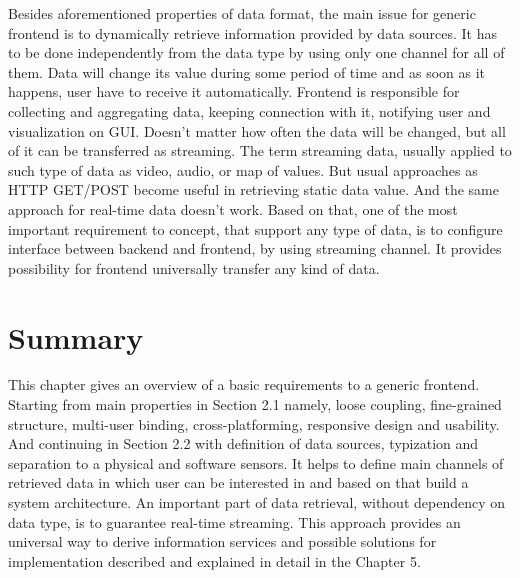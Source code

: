 	Besides aforementioned properties of data format, the main issue for generic frontend is to dynamically retrieve information provided by data sources. It has to be done independently from the data type by using only one channel for all of them. Data will change its value during some period of time and as soon as it happens, user have to receive it automatically. Frontend is responsible for collecting and aggregating data, keeping connection with it, notifying user and visualization on GUI. Doesn't matter how often the data will be changed, but all of it can be transferred as streaming. The term streaming data, usually applied to such type of data as video, audio, or map of values. But usual approaches as HTTP GET/POST become useful in retrieving static data value. And the same approach for real-time data doesn't work. Based on that, one of the most important requirement to concept, that support any type of data, is to configure interface between backend and frontend, by using streaming channel. It provides possibility for frontend universally transfer any kind of data.


\section{Summary}
	This chapter gives an overview of a basic requirements to a generic frontend. Starting from main properties in Section 2.1 namely, loose coupling, fine-grained structure, multi-user binding, cross-platforming, responsive design and usability. And continuing in Section 2.2 with definition of data sources, typization and separation to a physical and software sensors. It helps to define main channels of retrieved data in which user can be interested in and based on that build a system architecture. An important part of data retrieval, without dependency on data type, is to guarantee real-time streaming. This approach provides an universal way to derive information services and possible solutions for implementation described and explained in detail in the Chapter 5.
